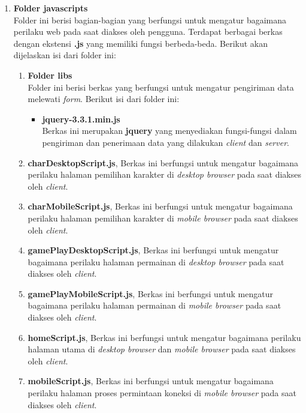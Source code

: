 \begin{enumerate}
\begin{enumerate}
		\item \textbf{Folder javascripts} \\
		Folder ini berisi bagian-bagian yang berfungsi untuk mengatur bagaimana perilaku web pada saat diakses oleh pengguna. Terdapat berbagai berkas dengan ekstensi \textbf{.js} yang memiliki fungsi berbeda-beda. Berikut akan dijelaskan isi dari folder ini:
		
		\begin{enumerate}
			\item \textbf{Folder libs} \\
			Folder ini berisi berkas yang berfungsi untuk mengatur pengiriman data melewati \textit{form}. Berikut isi dari folder ini:
			\begin{itemize}
				\item \textbf{jquery-3.3.1.min.js} \\ Berkas ini merupakan \textbf{jquery} yang menyediakan fungsi-fungsi dalam pengiriman dan penerimaan data yang dilakukan \textit{client} dan \textit{server}. 
			\end{itemize}
		
			\item \textbf{charDesktopScript.js}, Berkas ini berfungsi untuk mengatur bagaimana perilaku halaman pemilihan karakter di \textit{desktop browser} pada saat diakses oleh \textit{client}.
			
			\item \textbf{charMobileScript.js}, Berkas ini berfungsi untuk mengatur bagaimana perilaku halaman pemilihan karakter di \textit{mobile browser} pada saat diakses oleh \textit{client}.
			
			\item \textbf{gamePlayDesktopScript.js}, Berkas ini berfungsi untuk mengatur bagaimana perilaku halaman permainan di \textit{desktop browser} pada saat diakses oleh \textit{client}.
			
			\item \textbf{gamePlayMobileScript.js}, Berkas ini berfungsi untuk mengatur bagaimana perilaku halaman permainan di \textit{mobile browser} pada saat diakses oleh \textit{client}.
			
			\item \textbf{homeScript.js}, Berkas ini berfungsi untuk mengatur bagaimana perilaku halaman utama di \textit{desktop browser} dan \textit{mobile browser} pada saat diakses oleh \textit{client}.
			
			\item \textbf{mobileScript.js}, Berkas ini berfungsi untuk mengatur bagaimana perilaku halaman proses permintaan koneksi di \textit{mobile browser} pada saat diakses oleh \textit{client}.
			

\end{enumerate}
\end{enumerate}
\end{enumerate}
